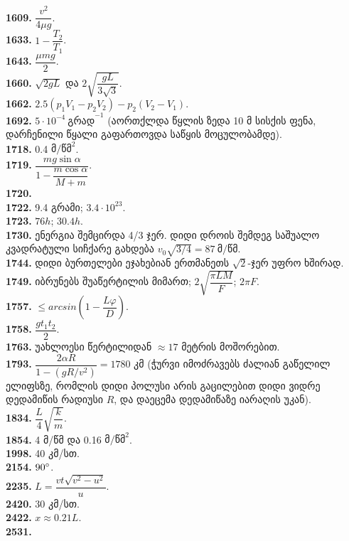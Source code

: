 \documentclass[12pt,a4paper,]{report}
\begin{document}
\textbf{1609.} $\dfrac{v^2}{4\mu g}$. \\
\textbf{1633.} $1-\dfrac{T_2}{T_1}$. \\
\textbf{1643.} $\dfrac{\mu m g}{2}.$\\
\textbf{1660.} $\sqrt{2gL}$ და $2\sqrt{\dfrac{gL}{3\sqrt{3}}}$. \\
\textbf{1662.} $2.5(p_1 V_1 - p_2 V_2) - p_2(V_2 - V_1)$. \\
\textbf{1692.} $5 \cdot 10^{-4}\ \text{გრად}^{-1}$ (აორთქლდა წყლის ზედა 10 მ სისქის ფენა, დარჩენილი წყალი გაფართოვდა საწყის მოცულობამდე).\\
\textbf{1718.} 0.4 $\text{მ}/\text{წმ}^2$. \\
\textbf{1719.} $\dfrac{mg\sin\alpha}{1-\dfrac{m\cos\alpha}{M+m}}$. \\
\textbf{1720.} \\
\textbf{1722.} 9.4 გრამი; $3.4 \cdot 10^{23}$.\\
\textbf{1723.} $76h$; $30.4h$.\\
\textbf{1730.} ენერგია შემცირდა 4/3 ჯერ. დიდი დროის შემდეგ საშუალო კვადრატული სიჩქარე გახდება $v_0 \sqrt{3/4} = 87\ \text{მ/წმ}$. \\
\textbf{1744.} დიდი ბურთელები ეჯახებიან ერთმანეთს $\sqrt{2}$-ჯერ უფრო ხშირად. \\
\textbf{1749.} იბრუნებს შუაწერტილის მიმართ; $2\sqrt{\dfrac{\pi LM}{F}}$; $2\pi F$. \\
\textbf{1757.} $\leq arcsin\left(1-\dfrac{L\varphi}{D} \right)$. \\
\textbf{1758.} $\dfrac{gt_1 t_2}{2}$. \\
\textbf{1763.} უახლოესი წერტილიდან $\approx 17$ მეტრის მოშორებით. \\
\textbf{1793.} $\dfrac{2\alpha R}{1 - (gR/v^2)} = 1780$ კმ (ჭურვი იმოძრავებს ძალიან გაწელილ ელიფსზე, რომლის დიდი პოლუსი არის გაცილებით დიდი ვიდრე დედამიწის რადიუსი $R$, და დაეცემა დედამიწაზე იარაღის უკან). \\
\textbf{1834.} $\dfrac{L}{4}\sqrt{\dfrac{k}{m}}$. \\
\textbf{1854.} 4 მ/წმ და 0.16 $\text{მ}/\text{წმ}^2$. \\
\textbf{1998.} 40 კმ/სთ. \\
\textbf{2154.} $90 \degree$. \\
\textbf{2235.} $L=\dfrac{vt\sqrt{v^2-u^2}}{u}$. \\
\textbf{2420.} 30 კმ/სთ. \\
\textbf{2422.} $x\approx0.21L$. \\
\textbf{2531.} 
\end{document}
